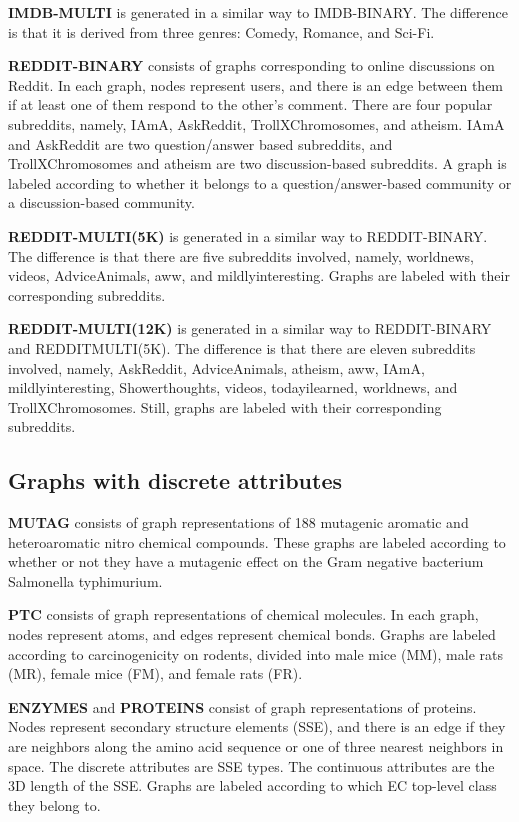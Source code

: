 \documentclass[11pt,onecolumn]{article}
\begin{document}
\textbf{IMDB-MULTI} \cite{yanardag2015deep} is generated in a similar way to IMDB-BINARY. The difference is that it is derived from three genres: Comedy, Romance, and Sci-Fi.

\textbf{REDDIT-BINARY}\cite{yanardag2015deep}  consists of graphs corresponding to online discussions on Reddit. In each graph, nodes represent users, and there is an edge between them if at least one of them respond to the other's comment. There are four popular subreddits, namely, IAmA, AskReddit, TrollXChromosomes, and atheism. IAmA and AskReddit are two question/answer based subreddits, and TrollXChromosomes and atheism are two discussion-based subreddits. A graph is labeled according to whether it belongs to a question/answer-based community or a discussion-based community.

\textbf{REDDIT-MULTI(5K)}\cite{yanardag2015deep} is generated in a similar way to REDDIT-BINARY. The difference is that there are five subreddits involved, namely, worldnews, videos, AdviceAnimals, aww, and mildlyinteresting. Graphs are labeled with their corresponding subreddits.

\textbf{REDDIT-MULTI(12K)} \cite{yanardag2015deep} is generated in a similar way to REDDIT-BINARY and REDDITMULTI(5K). The difference is that there are eleven subreddits involved, namely, AskReddit, AdviceAnimals, atheism, aww, IAmA, mildlyinteresting, Showerthoughts, videos, todayilearned, worldnews, and TrollXChromosomes. Still, graphs are labeled with their corresponding subreddits.


\subsection{Graphs with discrete attributes}

\textbf{MUTAG} \cite{debnath1991structure} consists of graph representations of 188 mutagenic aromatic and heteroaromatic nitro chemical compounds. These graphs are labeled according to whether or not they have a mutagenic effect on the Gram negative bacterium Salmonella typhimurium.

\textbf{PTC} \cite{helma2001predictive} consists of graph representations of chemical molecules. In each graph, nodes represent atoms, and edges represent chemical bonds. Graphs are labeled according to carcinogenicity on rodents, divided into male mice (MM), male rats (MR), female mice (FM), and female rats (FR).

\textbf{ENZYMES} and \textbf{PROTEINS} \cite{borgwardt2005protein} consist of graph representations of proteins. Nodes represent secondary structure elements (SSE), and there is an edge if they are neighbors along the amino acid sequence or one of three nearest neighbors in space. The discrete attributes are SSE types. The continuous attributes are the 3D length of the SSE. Graphs are labeled according to which EC top-level class they belong to.
\end{document}
